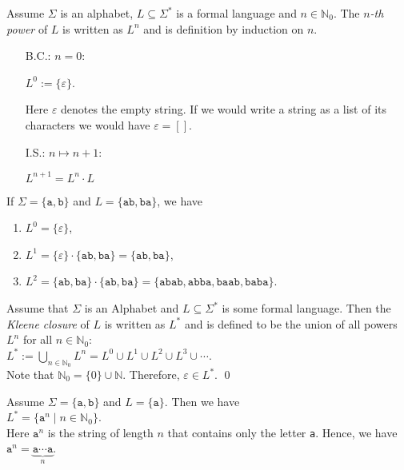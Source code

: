 \begin{Definition} 
Assume $\Sigma$ is an  alphabet, $L \subseteq \Sigma^*$ is a formal language and $n\in\mathbb{N}_0$.
The  \emph{$n$-th power} of $L$ is written as  $L^n$ and is definition by induction on  $n$. 
\begin{enumerate}
\item[B.C.:] $n = 0$: 

      $L^0 := \{ \varepsilon \}$.

      Here $\varepsilon$ denotes the empty string.  If we would write a string as a list of its characters we would have
      $\varepsilon = []$.
\item[I.S.:] $n \mapsto n + 1$:

      $L^{n+1} = L^n \cdot L$  \eox
\end{enumerate}
\end{Definition}

\exampleEng
If $\Sigma = \{ \texttt{a}, \texttt{b} \}$ and $L = \{ \texttt{ab}, \texttt{ba} \}$, we have
\begin{enumerate}
\item $L^0 = \{ \varepsilon \}$,
\item $L^1 = \{ \varepsilon \} \cdot \{ \texttt{ab}, \texttt{ba} \} = \{ \texttt{ab}, \texttt{ba} \}$,
\item $L^2 = \{ \texttt{ab}, \texttt{ba} \} \cdot \{ \texttt{ab}, \texttt{ba} \} = 
             \{ \texttt{abab}, \texttt{abba}, \texttt{baab}, \texttt{baba} \}$.  \eox
\end{enumerate}

\begin{Definition}
  Assume that $\Sigma$ is an Alphabet and $L \subseteq \Sigma^*$ is some formal language. Then the
  \emph{Kleene closure} of $L$ is written as $L^*$ and is defined to be the union of all powers
  $L^n$ for all $n \in \mathbb{N}_0$: 
  \\[0.2cm]
  \hspace*{1.3cm}
  $L^* := \bigcup\limits_{n \in \mathbb{N}_0} L^n = L^0 \cup L^1 \cup L^2 \cup L^3 \cup \cdots$.
  \\[0.2cm]
  Note that $\mathbb{N}_0 = \{0\} \cup \mathbb{N}$. Therefore, $\varepsilon \in L^*$.
  \qed  
\end{Definition}

\exampleEng
Assume $\Sigma = \{ \texttt{a}, \texttt{b} \}$ and  $L = \{ \texttt{a} \}$.  Then we have
\\[0.2cm]
\hspace*{1.3cm}
$L^* = \{ \texttt{a}^n \mid n \in \mathbb{N}_0 \}$.
\\[0.2cm]
Here $\texttt{a}^n$ is the string of length $n$ that contains only the letter \texttt{a}.  Hence, we have 
\\[0.2cm]
\hspace*{1.3cm}
$\texttt{a}^n = \underbrace{\texttt{a} \cdots \texttt{a}}_n$.  \eox 


